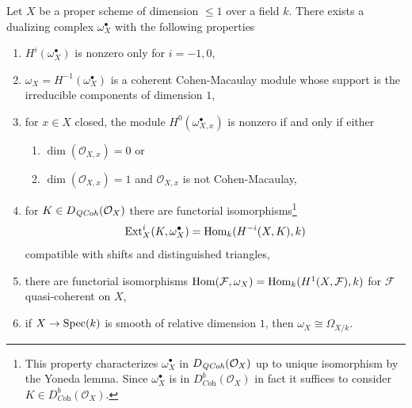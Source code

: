 \begin{lemma}
\label{lemma-duality-dim-1}
Let $X$ be a proper scheme of dimension $\leq 1$ over a field $k$.
There exists a dualizing complex $\omega_X^\bullet$ with the
following properties
\begin{enumerate}
\item $H^i(\omega_X^\bullet)$ is nonzero only for $i = -1, 0$,
\item $\omega_X = H^{-1}(\omega_X^\bullet)$
is a coherent Cohen-Macaulay module whose support is the
irreducible components of dimension $1$,
\item for $x \in X$ closed, the module $H^0(\omega_{X, x}^\bullet)$
is nonzero if and only if either
\begin{enumerate}
\item $\dim(\mathcal{O}_{X, x}) = 0$ or
\item $\dim(\mathcal{O}_{X, x}) = 1$
and $\mathcal{O}_{X, x}$ is not Cohen-Macaulay,
\end{enumerate}
\item for $K \in D_{\mathit{QCoh}}(\mathcal{O}_X)$ there are functorial
isomorphisms\footnote{This property
characterizes $\omega_X^\bullet$ in $D_{\mathit{QCoh}}(\mathcal{O}_X)$
up to unique isomorphism by the Yoneda lemma. Since $\omega_X^\bullet$
is in $D^b_{\textit{Coh}}(\mathcal{O}_X)$ in fact it suffices to consider
$K \in D^b_{\textit{Coh}}(\mathcal{O}_X)$.}
$$
\mathop{\mathrm{Ext}}\nolimits^i_X(K, \omega_X^\bullet) = \mathop{\mathrm{Hom}}\nolimits_k(H^{-i}(X, K), k)
$$
compatible with shifts and distinguished triangles,
\item there are functorial isomorphisms
$\mathop{\mathrm{Hom}}\nolimits(\mathcal{F}, \omega_X) = \mathop{\mathrm{Hom}}\nolimits_k(H^1(X, \mathcal{F}), k)$
for $\mathcal{F}$ quasi-coherent on $X$,
\item if $X \to \mathop{\mathrm{Spec}}(k)$ is smooth of relative dimension $1$,
then $\omega_X \cong \Omega_{X/k}$.
\end{enumerate}
\end{lemma}

